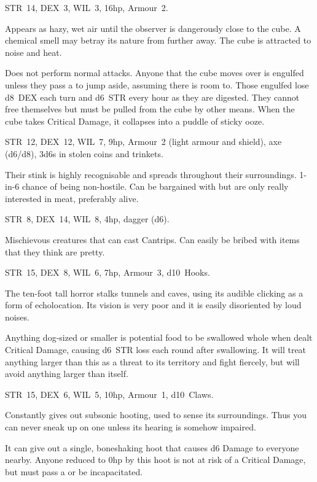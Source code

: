 \documentclass[itdr]{subfiles}
\begin{document}
STR~14, DEX~3, WIL~3, 16hp, Armour~2.

Appears as hazy, wet air until the observer is dangerously close to the cube. A chemical smell may betray its nature from further away. The cube is
attracted to noise and heat.

Does not perform normal attacks. Anyone that the cube moves over is engulfed unless they pass a  to jump aside, assuming there is room to. Those engulfed lose d8~DEX each turn and d6~STR every hour as they are digested. They cannot free themselves but must be pulled from the cube by other means. When the cube takes Critical Damage, it collapses into a puddle of sticky ooze.


STR~12, DEX~12, WIL~7, 9hp, Armour~2 (light armour and shield), axe (d6/d8), 3d6s in stolen coins and trinkets.

Their stink is highly recognisable and spreads throughout their surroundings.
1-in-6 chance of being non-hostile. Can be bargained with but are only really interested in meat, preferably alive.


STR~8, DEX~14, WIL~8, 4hp, dagger (d6).

Mischievous creatures that can cast Cantrips. Can easily be bribed with items that they think are pretty.


STR~15, DEX~8, WIL~6, 7hp, Armour~3, d10~Hooks.

The ten-foot tall horror stalks tunnels and caves, using its audible clicking as a form of echolocation. Its vision is very poor and it is easily disoriented by loud noises.

Anything dog-sized or smaller is potential food to be swallowed whole when dealt Critical Damage, causing d6~STR loss each round after swallowing. It will treat anything larger than this as a threat to its territory and fight fiercely, but will avoid anything larger than itself.


STR~15, DEX~6, WIL~5, 10hp, Armour~1, d10~Claws.

Constantly gives out subsonic hooting, used to sense its surroundings. Thus you can never sneak up on one unless its hearing is somehow impaired.

It can give out a single, boneshaking hoot that causes d6 Damage to everyone nearby. Anyone reduced to 0hp by this hoot is not at risk of a Critical Damage, but must pass a  or be incapacitated.
\end{document}
